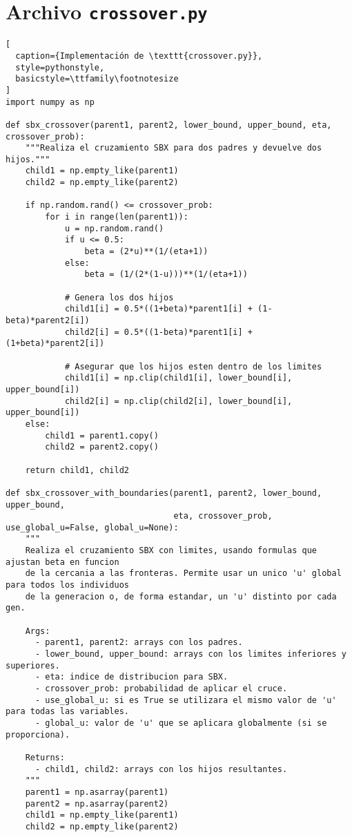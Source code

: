 \section{Archivo \texttt{crossover.py}}
\begin{lstlisting}[
  caption={Implementación de \texttt{crossover.py}},
  style=pythonstyle,
  basicstyle=\ttfamily\footnotesize
]
import numpy as np

def sbx_crossover(parent1, parent2, lower_bound, upper_bound, eta, crossover_prob):
    """Realiza el cruzamiento SBX para dos padres y devuelve dos hijos."""
    child1 = np.empty_like(parent1)
    child2 = np.empty_like(parent2)
    
    if np.random.rand() <= crossover_prob:
        for i in range(len(parent1)):
            u = np.random.rand()
            if u <= 0.5:
                beta = (2*u)**(1/(eta+1))
            else:
                beta = (1/(2*(1-u)))**(1/(eta+1))
            
            # Genera los dos hijos
            child1[i] = 0.5*((1+beta)*parent1[i] + (1-beta)*parent2[i])
            child2[i] = 0.5*((1-beta)*parent1[i] + (1+beta)*parent2[i])
            
            # Asegurar que los hijos esten dentro de los limites
            child1[i] = np.clip(child1[i], lower_bound[i], upper_bound[i])
            child2[i] = np.clip(child2[i], lower_bound[i], upper_bound[i])
    else:
        child1 = parent1.copy()
        child2 = parent2.copy()
    
    return child1, child2

def sbx_crossover_with_boundaries(parent1, parent2, lower_bound, upper_bound,
                                  eta, crossover_prob, use_global_u=False, global_u=None):
    """
    Realiza el cruzamiento SBX con limites, usando formulas que ajustan beta en funcion
    de la cercania a las fronteras. Permite usar un unico 'u' global para todos los individuos 
    de la generacion o, de forma estandar, un 'u' distinto por cada gen.
    
    Args:
      - parent1, parent2: arrays con los padres.
      - lower_bound, upper_bound: arrays con los limites inferiores y superiores.
      - eta: indice de distribucion para SBX.
      - crossover_prob: probabilidad de aplicar el cruce.
      - use_global_u: si es True se utilizara el mismo valor de 'u' para todas las variables.
      - global_u: valor de 'u' que se aplicara globalmente (si se proporciona).
      
    Returns:
      - child1, child2: arrays con los hijos resultantes.
    """
    parent1 = np.asarray(parent1)
    parent2 = np.asarray(parent2)
    child1 = np.empty_like(parent1)
    child2 = np.empty_like(parent2)
    

\end{lstlisting}

